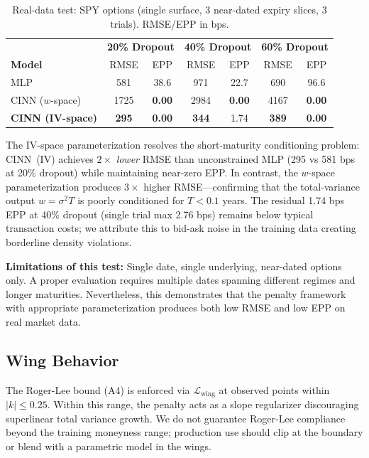 \documentclass[11pt,a4paper]{article}
\newcommand{\loss}{\mathcal{L}}
\begin{document}
\begin{table}[h]
\centering
\caption{Real-data test: SPY options (single surface, 3 near-dated expiry slices, 3 trials). RMSE/EPP in bps.}
\label{tab:spy}
\begin{tabular}{l|cc|cc|cc}
\toprule
& \multicolumn{2}{c|}{\textbf{20\% Dropout}} & \multicolumn{2}{c|}{\textbf{40\% Dropout}} & \multicolumn{2}{c}{\textbf{60\% Dropout}} \\
\textbf{Model} & RMSE & EPP & RMSE & EPP & RMSE & EPP \\
\midrule
MLP & 581 & 38.6 & 971 & 22.7 & 690 & 96.6 \\
CINN ($w$-space) & 1725 & \textbf{0.00} & 2984 & \textbf{0.00} & 4167 & \textbf{0.00} \\
\textbf{CINN (IV-space)} & \textbf{295} & \textbf{0.00} & \textbf{344} & 1.74 & \textbf{389} & \textbf{0.00} \\
\bottomrule
\end{tabular}
\end{table}

The IV-space parameterization resolves the short-maturity conditioning problem: CINN~(IV) achieves $2\times$ \textit{lower} RMSE than unconstrained MLP (295 vs 581 bps at 20\% dropout) while maintaining near-zero EPP. In contrast, the $w$-space parameterization produces $3\times$ higher RMSE---confirming that the total-variance output $w = \sigma^2 T$ is poorly conditioned for $T < 0.1$ years. The residual 1.74 bps EPP at 40\% dropout (single trial max 2.76 bps) remains below typical transaction costs; we attribute this to bid-ask noise in the training data creating borderline density violations.

\textbf{Limitations of this test:} Single date, single underlying, near-dated options only. A proper evaluation requires multiple dates spanning different regimes and longer maturities. Nevertheless, this demonstrates that the penalty framework with appropriate parameterization produces both low RMSE and low EPP on real market data.

\subsection{Wing Behavior}

The Roger-Lee bound (A4) is enforced via $\loss_{\text{wing}}$ at observed points within $|k| \leq 0.25$. Within this range, the penalty acts as a slope regularizer discouraging superlinear total variance growth. We do not guarantee Roger-Lee compliance beyond the training moneyness range; production use should clip at the boundary or blend with a parametric model in the wings.
\end{document}
